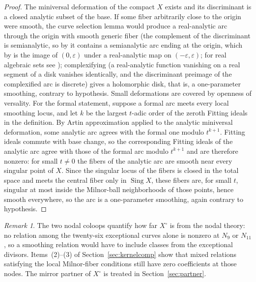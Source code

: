 \documentclass[11pt]{amsart}
\theoremstyle{definition}
\theoremstyle{remark}
\newtheorem{remark}[theorem]{Remark}
\theoremstyle{plain}
\newcommand{\Sing}{\operatorname{Sing}}
\begin{document}
\begin{proof}
The miniversal deformation of the compact $X$ exists
\cite{Grauert74} and its discriminant is a closed analytic subset of
the base.  If some fiber arbitrarily close to the origin were smooth,
the curve selection lemma would produce a
real-analytic arc through the origin with smooth generic fiber
(the complement of the discriminant is semianalytic, so by
\cite[\S19, Prop.~2]{Lojasiewicz65} it contains a semianalytic arc
ending at the origin, which by \cite[Lemma~6.3(1)]{BM88} is the image
of $(0,\varepsilon)$ under a real-analytic map on
$(-\varepsilon,\varepsilon)$; for real algebraic sets see
\cite{Milnor68});
complexifying (a real-analytic function vanishing on a real segment
of a disk vanishes identically, and the discriminant preimage of the
complexified arc is discrete) gives a holomorphic disk, that is, a
one-parameter smoothing, contrary to hypothesis.  Small
deformations are covered by openness of versality.  For the formal
statement, suppose a formal arc meets every local smoothing locus, and let
$k$ be the largest $t$-adic order of the zeroth Fitting ideals in the
definition.  By Artin approximation \cite{Artin68} applied to the
analytic miniversal deformation, some analytic arc agrees with the formal
one modulo $t^{k+1}$.  Fitting ideals commute with base change, so the
corresponding Fitting ideals of the analytic arc agree with those of the
formal arc modulo $t^{k+1}$ and are therefore nonzero: for small $t\neq0$
the fibers of the analytic arc are smooth near every singular point
of $X$.  Since the singular locus of the
fibers is closed in the total space and meets the central fiber only
in $\Sing X$, these fibers are, for
small $t$, singular at most inside the Milnor-ball
neighborhoods of those points, hence smooth everywhere, so the arc is a
one-parameter smoothing, again contrary to hypothesis.
\end{proof}

\begin{remark}\label{rem:mirror}
The two nodal coloops quantify how far $X^{\circ}$ is from the nodal
theory: no relation among the twenty-six exceptional curves alone is
nonzero at $N_9$ or $N_{11}$, so a smoothing relation would have to include
classes from the exceptional divisors.  Items~(2)--(3) of
Section~\ref{sec:kernelcomp} show that mixed relations satisfying the local
Milnor-fiber conditions still have zero coefficients at those nodes.
The mirror partner of
$X^{\circ}$ is treated in Section~\ref{sec:partner}.
\end{remark}
\end{document}
